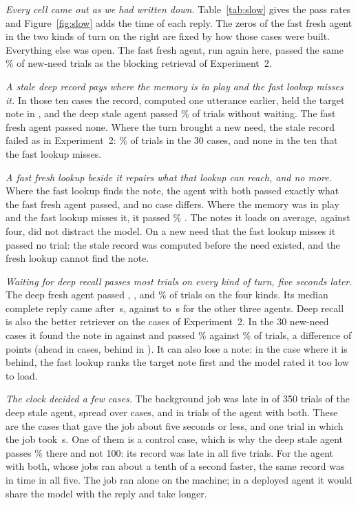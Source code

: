 \documentclass[10pt]{article}
\begin{document}
\emph{Every cell came out as we had written down.} Table~\ref{tab:slow} gives the pass rates and Figure~\ref{fig:slow} adds the time of each reply. The zeros of the fast fresh agent in the two kinds of turn on the right are fixed by how those cases were built. Everything else was open. The fast fresh agent, run again here, passed the same \SFastB\% of new-need trials as the blocking retrieval of Experiment~2.

\emph{A stale deep record pays where the memory is in play and the fast lookup misses it.} In those ten cases the record, computed one utterance earlier, held the target note in \SGoldStaleC{}, and the deep stale agent passed \SStaleC\% \SStaleCCI{} of trials without waiting. The fast fresh agent passed none. Where the turn brought a new need, the stale record failed as in Experiment~2: \SStaleB\% of trials in the 30 cases, and none in the ten that the fast lookup misses.

\emph{A fast fresh lookup beside it repairs what that lookup can reach, and no more.} Where the fast lookup finds the note, the agent with both passed exactly what the fast fresh agent passed, and no case differs. Where the memory was in play and the fast lookup misses it, it passed \SBothC\% \SBothCCI{}. The \SNotesBoth{} notes it loads on average, against four, did not distract the model. On a new need that the fast lookup misses it passed no trial: the stale record was computed before the need existed, and the fresh lookup cannot find the note.

\emph{Waiting for deep recall passes most trials on every kind of turn, five seconds later.} The deep fresh agent passed \SDeepA{}, \SDeepB{}, \SDeepC{} and \SDeepD\% of trials on the four kinds. Its median complete reply came after \SReplyDeep\,s, against \SReplyStale{} to \SReplyFast\,s for the other three agents. Deep recall is also the better retriever on the cases of Experiment~2. In the 30 new-need cases it found the note in \SGoldDeepB{} against \SGoldFastB{} and passed \SDeepB\% against \SFastB\% of trials, a difference of \SDiffDeepFastB{} points \SDiffDeepFastBCI{} (ahead in \SAheadDeepFastB{} cases, behind in \SBehindDeepFastB{}). It can also lose a note: in the case where it is behind, the fast lookup ranks the target note first and the model rated it too low to load.

\emph{The clock decided a few cases.} The background job was late in \SNotReadyTrialsStale{} of 350 trials of the deep stale agent, spread over \SNotReadyCasesStale{} cases, and in \SNotReadyTrialsBoth{} trials of the agent with both. These are the cases that gave the job about five seconds or less, and one trial in which the job took \SJobMax\,s. One of them is a control case, which is why the deep stale agent passes \SStaleA\% there and not 100: its record was late in all five trials. For the agent with both, whose jobs ran about a tenth of a second faster, the same record was in time in all five. The job ran alone on the machine; in a deployed agent it would share the model with the reply and take longer.
\end{document}

